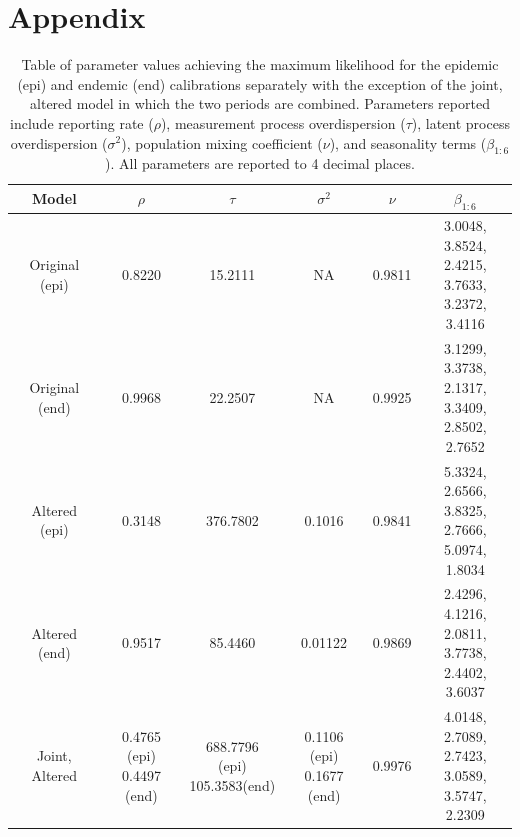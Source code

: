 \documentclass[12pt]{article}
\begin{document}
\newpage

\section{Appendix}

\renewcommand{\thefigure}{A\arabic{figure}}
\setcounter{figure}{0}
\renewcommand{\thetable}{A\arabic{table}}
\setcounter{table}{0}
\begin{table}[H]
\caption{Table of parameter values achieving the maximum likelihood for the epidemic (epi) and endemic (end) calibrations separately with the exception of the joint, altered model in which the two periods are combined. Parameters reported include reporting rate ($\rho$), measurement process overdispersion ($\tau$), latent process overdispersion ($\sigma^2$), population mixing coefficient ($\nu$), and seasonality terms ($\beta_{1:6}$). All parameters are reported to 4 decimal places.}
\begin{center}
\begin{tabular}{||c | c c c c c ||}
 \hline
 Model & $\rho$ & $\tau$ & $\sigma^2$ & $\nu$ & $\beta_{1:6}$ \\ [0.5ex]
 \hline\hline
 Original (epi) & 0.8220 & 15.2111 & NA & 0.9811 & \makecell{3.0048, 3.8524,\\2.4215, 3.7633,\\3.2372, 3.4116}\\
 \hline
 Original (end) & 0.9968 & 22.2507 & NA & 0.9925 & \makecell{3.1299, 3.3738,\\2.1317, 3.3409,\\2.8502, 2.7652}\\
 \hline
 Altered (epi) & 0.3148 & 376.7802 & 0.1016 & 0.9841 & \makecell{5.3324, 2.6566,\\3.8325, 2.7666,\\5.0974, 1.8034}\\
 \hline
 Altered (end) & 0.9517 & 85.4460 & 0.01122 & 0.9869 & \makecell{2.4296, 4.1216,\\2.0811, 3.7738,\\2.4402, 3.6037}\\
 \hline
 Joint, Altered & \makecell{0.4765 (epi)\\0.4497 (end)} & \makecell{688.7796 (epi)\\105.3583(end)} & \makecell{0.1106 (epi)\\0.1677 (end)} & 0.9976 & \makecell{4.0148, 2.7089,\\2.7423, 3.0589,\\3.5747, 2.2309}\\
 \hline
\end{tabular}
\end{center}
\end{table}
\end{document}
